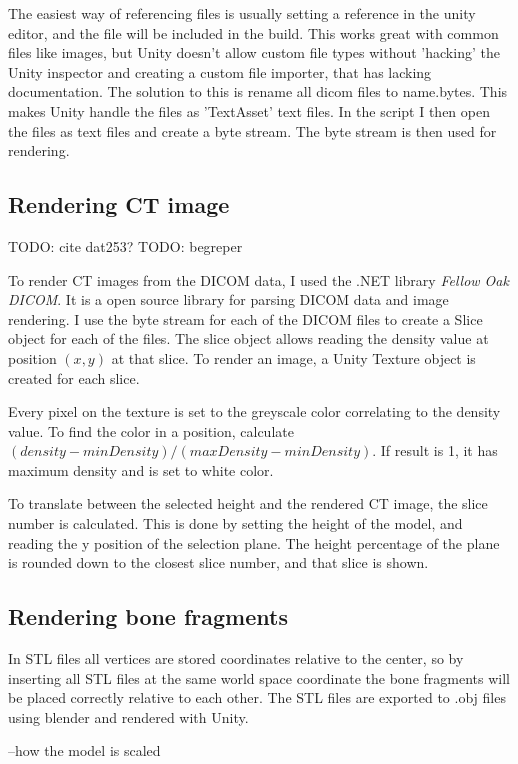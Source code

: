 \documentclass[a4paper]{report}
\begin{document}
The easiest way of referencing files is usually setting a reference in the unity editor, and the file will be included in the build. This works great with common files like images, but Unity doesn't allow custom file types without 'hacking' the Unity inspector and creating a custom file importer\cite{scriptedimporters_unity_nodate}, that has lacking documentation. The solution to this is rename all dicom files to {name}.bytes. This makes Unity handle the files as 'TextAsset' text files\cite{textassets_unity_nodate}. In the script I then open the files as text files and create a byte stream. The byte stream is then used for rendering.

\subsection{Rendering CT image}
TODO: cite dat253?
TODO: begreper

To render CT images from the DICOM data, I used the .NET library \emph{Fellow Oak DICOM}\cite{noauthor_fellow_2022}. It is a open source library for parsing DICOM data and image rendering.
I use the byte stream for each of the DICOM files to create a Slice object for each of the files. The slice object allows reading the density value at position $(x, y)$ at that slice. To render an image, a Unity Texture object is created for each slice.

Every pixel on the texture is set to the greyscale color correlating to the density value. To find the color in a position, calculate $(density-minDensity)/(maxDensity-minDensity)$. If result is 1, it has maximum density and is set to white color.

To translate between the selected height and the rendered CT image, the slice number is calculated. This is done by setting the height of the model, and reading the y position of the selection plane. The height percentage of the plane is rounded down to the closest slice number, and that slice is shown.


\subsection{Rendering bone fragments}
In STL files all vertices are stored coordinates relative to the center, so by inserting all STL files at the same world space coordinate the bone fragments will be placed correctly relative to each other. The STL files are exported to .obj files using blender and rendered with Unity.

--how the model is scaled
\end{document}
